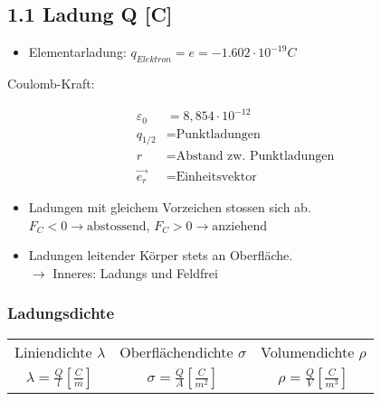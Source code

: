 \subsection{1.1 Ladung Q [C]}

\begin{itemize}
    \item Elementarladung: $q_{Elektron} = e = - 1.602 \cdot 10^{-19}C$
\end{itemize}

Coulomb-Kraft: 

\begin{minipage}{0.53\linewidth}
    \begin{footnotesize}
        \begin{center}
        \end{center}
    \end{footnotesize}
\end{minipage}
\begin{minipage}{0.46\linewidth}
    \begin{scriptsize}
        \begin{center}
            \begin{align*}
                \varepsilon_0 &= 8,854\cdot10^{-12}
                \\q_{1/2} &= \text{Punktladungen}
                \\r &= \text{Abstand zw. Punktladungen}
                \\\vec{e_r} &= \text{Einheitsvektor}
            \end{align*}
        \end{center}
    \end{scriptsize}
\end{minipage}
\vspace{1mm}



\begin{itemize}
    \item Ladungen mit gleichem Vorzeichen stossen sich ab.
    \\$F_C<0 \rightarrow \text{abstossend}$,
    $F_C>0 \rightarrow \text{anziehend}$
    \item Ladungen leitender Körper stets an Oberfläche.\\
    $\rightarrow$ Inneres: Ladungs und Feldfrei
\end{itemize}

\subsubsection*{Ladungsdichte}

\begin{tabular}{c c c}
    Liniendichte $\lambda$ & Oberflächendichte $\sigma$ & Volumendichte $\rho$ \\
    $\lambda = \frac{Q}{l} \left[\frac{C}{m}\right]$ & $\sigma = \frac{Q}{A} \left[\frac{C}{m^2}\right]$ & $\rho = \frac{Q}{V} \left[\frac{C}{m^3}\right]$
\end{tabular}


